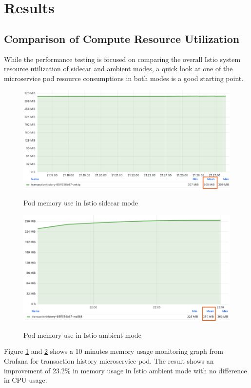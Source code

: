\section{Results}
\subsection{Comparison of Compute Resource Utilization}
While the performance testing is focused on comparing the overall Istio system resource utilization of sidecar and ambient modes, a quick look at one of the microservice pod resource consumptions in both modes is a good starting point.

\begin{figure}[ht!]
    \centering
    \caption{Pod memory use in Istio sidecar mode}
    \includegraphics[width=0.95\linewidth]{resources/01-sidecar-pod-mem.png}
    \label{result:podMemUseSidecar}
\end{figure}

\begin{figure}[ht!]
    \centering
    \caption{Pod memory use in Istio ambient mode}
    \includegraphics[width=0.95\linewidth]{resources/02-ambient-pod-mem.png}
    \label{result:podMemUseAmbient}
\end{figure}

Figure \ref{result:podMemUseSidecar} and \ref{result:podMemUseAmbient} shows a 10 minutes memory usage monitoring graph from Grafana for transaction history microservice pod. The result shows an improvement of 23.2\% in memory usage in Istio ambient mode with no difference in CPU usage.

